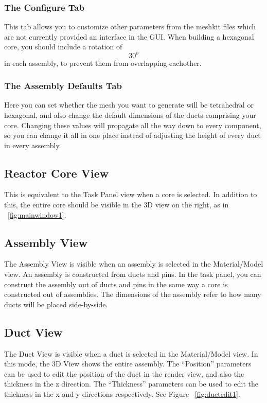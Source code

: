 \subsubsection{The Configure Tab}
This tab allows you to customize other parameters from the meshkit files which are not currently provided an interface in the GUI.  When building a hexagonal core, you should include a rotation of $$30^o$$ in each assembly, to prevent them from overlapping eachother.

\subsubsection{The Assembly Defaults Tab}
Here you can set whether the mesh you want to generate will be tetrahedral or hexagonal, and also change the default dimensions of the ducts comprising your core.  Changing these values will propagate all the way down to every component, so you can change it all in one place instead of adjusting the height of every duct in every assembly.

\subsection{Reactor Core View}
This is equivalent to the Task Panel view when a core is selected.  In addition to this, the entire core should be visible in the 3D view on the right, as in ~\ref{fig:mainwindow1}.

\subsection{Assembly View}
The Assembly View is visible when an assembly is selected in the Material/Model view.  An assembly is constructed from ducts and pins.  In the task panel, you can construct the assembly out of ducts and pins in the same way a core is constructed out of assemblies.  The dimensions of the assembly refer to how many ducts will be placed side-by-side.

\subsection{Duct View}
The Duct View is visible when a duct is selected in the Material/Model view.  In this mode, the 3D View shows the entire assembly.  The ``Position'' parameters can be used to edit the position of the duct in the render view, and also the thickness in the z direction.  The ``Thickness'' parameters can be used to edit the thickness in the x and y directions respectively. See Figure ~\ref{fig:ductedit1}.

